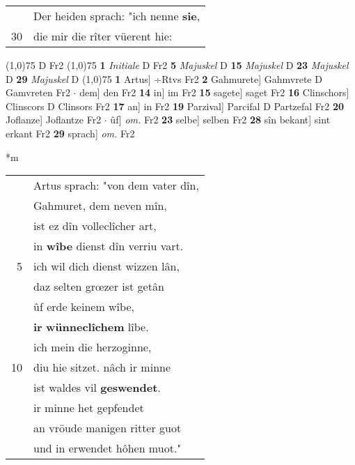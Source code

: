 \documentclass[8pt,a4paper,notitlepage]{article}
\begin{document}
\begin{table}[ht]
\begin{minipage}[t]{0.5\linewidth}
\begin{tabular}{rl}
 & Der heiden sprach: "ich nenne \textbf{sie},\\ 
30 & die mir die rîter vüerent hie:\\ 
\end{tabular}
\scriptsize
\line(1,0){75} \newline
D Fr2 \newline
\line(1,0){75} \newline
\textbf{1} \textit{Initiale} D Fr2  \textbf{5} \textit{Majuskel} D  \textbf{15} \textit{Majuskel} D  \textbf{23} \textit{Majuskel} D  \textbf{29} \textit{Majuskel} D  \newline
\line(1,0){75} \newline
\textbf{1} Artus] ÷Rtvs Fr2 \textbf{2} Gahmurete] Gahmvrete D Gamvreten Fr2  $\cdot$ dem] den Fr2 \textbf{14} in] im Fr2 \textbf{15} sagete] saget Fr2 \textbf{16} Clinschors] Clinscors D Clinsors Fr2 \textbf{17} an] in Fr2 \textbf{19} Parzival] Parcifal D Partzefal Fr2 \textbf{20} Joflanze] Joflantze Fr2  $\cdot$ ûf] \textit{om.} Fr2 \textbf{23} selbe] selben Fr2 \textbf{28} sîn bekant] sint erkant Fr2 \textbf{29} sprach] \textit{om.} Fr2 \newline
\end{minipage}
\hspace{0.5cm}
\begin{minipage}[t]{0.5\linewidth}
\small
\begin{center}*m
\end{center}
\begin{tabular}{rl}
 & Artus sprach: "von dem vater dîn,\\ 
 & Gahmuret, dem neven mîn,\\ 
 & ist ez dîn volleclîcher art,\\ 
 & in \textbf{wîbe} dienst dîn verriu vart.\\ 
5 & ich wil dich dienst wizzen lân,\\ 
 & daz selten grœzer ist getân\\ 
 & ûf erde keinem wîbe,\\ 
 & \textbf{ir} \textbf{wünneclîchem} lîbe.\\ 
 & ich mein die herzoginne,\\ 
10 & diu hie sitzet. nâch ir minne\\ 
 & ist waldes vil \textbf{geswendet}.\\ 
 & ir minne het gepfendet\\ 
 & an vröude manigen ritter guot\\ 
 & und in erwendet hôhen muot."\\ 

\end{tabular}
\end{minipage}
\end{table}
\end{document}
